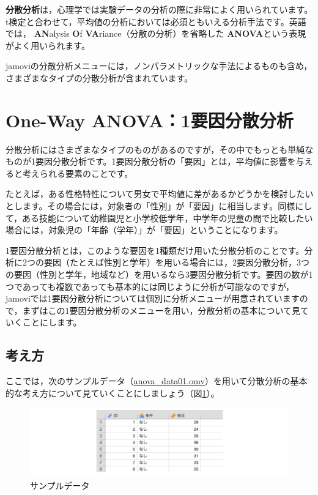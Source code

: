 \documentclass[
  12pt,
  a5jpaper,
  lualatex, ja=standard]{bxjsbook}
\renewcommand{\emph}[1]{\textbf{\color{emph} #1}}
\begin{document}
\emph{分散分析}は，心理学では実験データの分析の際に非常によく用いられています。t検定と合わせて，平均値の分析においては必須ともいえる分析手法です。英語では，\emph{AN}alysis \emph{O}f \emph{VA}riance（分散の分析）を省略した\emph{ANOVA}という表現がよく用いられます。

jamoviの分散分析メニューには，ノンパラメトリックな手法によるものも含め，さまざまなタイプの分散分析が含まれています。

\hypertarget{sec:ANOVA-oneway}{%
\section{One-Way ANOVA：1要因分散分析}\label{sec:ANOVA-oneway}}

分散分析にはさまざまなタイプのものがあるのですが，その中でもっとも単純なものが1要因分散分析です。1要因分散分析の「要因」とは，平均値に影響を与えると考えられる要素のことです。

たとえば，ある性格特性について男女で平均値に差があるかどうかを検討したいとします。その場合には，対象者の「性別」が「要因」に相当します。同様にして，ある技能について幼稚園児と小学校低学年，中学年の児童の間で比較したい場合には，対象児の「年齢（学年）」が「要因」ということになります。

1要因分散分析とは，このような要因を1種類だけ用いた分散分析のことです。分析に2つの要因（たとえば性別と学年）を用いる場合には，2要因分散分析，3つの要因（性別と学年，地域など）を用いるなら3要因分散分析です。要因の数が1つであっても複数であっても基本的には同じように分析が可能なのですが，jamoviでは1要因分散分析については個別に分析メニューが用意されていますので，まずはこの1要因分散分析のメニューを用い，分散分析の基本について見ていくことにします。

\hypertarget{sub:ANOVA-oneway-basics}{%
\subsection{考え方}\label{sub:ANOVA-oneway-basics}}

ここでは，次のサンプルデータ（\href{https://github.com/sbtseiji/jmv_compguide/raw/main/data/omv/anova_data01.omv}{anova\_data01.omv}）を用いて分散分析の基本的な考え方について見ていくことにしましょう（図\ref{fig:ANOVA-data01}）。

\begin{figure}[!ht]

{\centering \includegraphics[width=1\linewidth]{images/ANOVA/data01} 

}

\caption{サンプルデータ}\label{fig:ANOVA-data01}
\end{figure}
\end{document}
